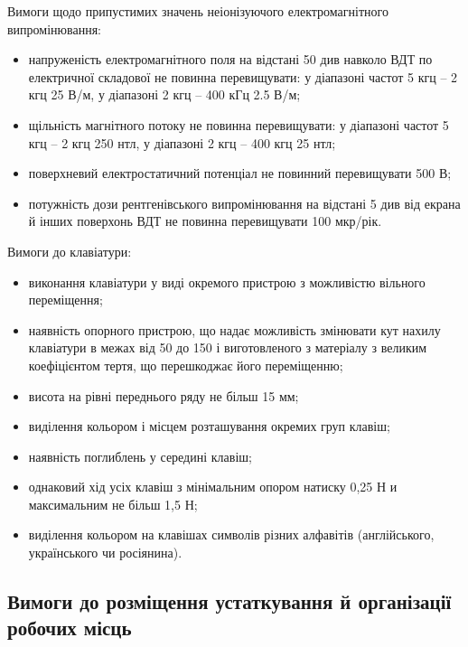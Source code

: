 \documentclass[simple,a4paper,14pt,ukrainian,utf8]{eskdtext}
\begin{document}
\begin{appendices}
                Вимоги щодо припустимих значень неіонізуючого електромагнітного випромінювання:

                \begin{itemize}
                    \item напруженість електромагнітного поля на відстані 50 див навколо ВДТ по електричної складової не повинна перевищувати: у діапазоні частот 5 кгц -- 2 кгц 25 В/м, у діапазоні 2 кгц -- 400 кГц 2.5 В/м;
                    \item щільність магнітного потоку не повинна перевищувати: у діапазоні частот 5 кгц -- 2 кгц 250 нтл, у діапазоні 2 кгц -- 400 кгц 25 нтл;
                    \item поверхневий електростатичний потенціал не повинний перевищувати 500 В;
                    \item потужність дози рентгенівського випромінювання на відстані 5 див від екрана й інших поверхонь ВДТ не повинна перевищувати 100 мкр/рік.
                \end{itemize}

                Вимоги до клавіатури:

                \begin{itemize}
                    \item виконання клавіатури у виді окремого пристрою з можливістю вільного переміщення;
                    \item наявність опорного пристрою, що надає можливість змінювати кут нахилу клавіатури в межах від 50 до 150 і виготовленого з матеріалу з великим коефіцієнтом тертя, що перешкоджає його переміщенню;
                    \item висота на рівні переднього ряду не більш 15 мм;
                    \item виділення кольором і місцем розташування окремих груп клавіш;
                    \item наявність поглиблень у середині клавіш;
                    \item однаковий хід усіх клавіш з мінімальним опором натиску 0,25 Н и максимальним не більш 1,5 Н;
                    \item виділення кольором на клавішах символів різних алфавітів (англійського, українського чи росіянина).
                \end{itemize}

            \subsection{Вимоги до розміщення устаткування й організації робочих місць}


\end{appendices}
\end{document}

